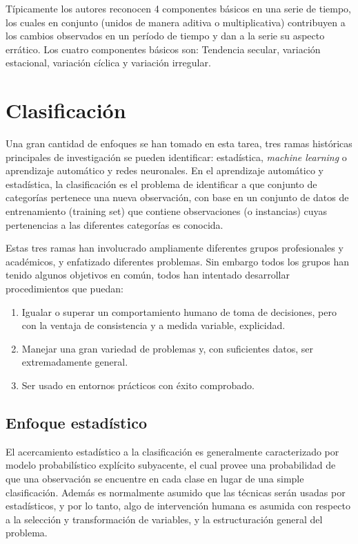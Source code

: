 Típicamente los autores reconocen 4 componentes básicos en una serie de tiempo, los cuales en conjunto (unidos de manera aditiva o multiplicativa) contribuyen a los cambios observados en un período de tiempo y dan a la serie su aspecto errático.
Los cuatro componentes básicos son: Tendencia secular, variación estacional, variación cíclica y variación irregular.

\section{Clasificación}

Una gran cantidad de enfoques se han tomado en esta tarea, tres ramas históricas principales de investigación se pueden identificar: estadística, \textit{machine learning} o aprendizaje automático y redes neuronales. 
En el aprendizaje automático y estadística, la clasificación es el problema de identificar a que conjunto de categorías pertenece una nueva observación, con base en un conjunto de datos de entrenamiento (training set) que contiene observaciones  (o instancias) cuyas pertenencias a las diferentes categorías es conocida.

Estas tres ramas han involucrado ampliamente diferentes grupos profesionales y académicos, y enfatizado diferentes problemas.
Sin embargo todos los grupos han tenido algunos objetivos en común, todos han intentado desarrollar procedimientos que puedan:

\begin{enumerate}
	\item Igualar o superar un comportamiento humano de toma de decisiones, pero con la ventaja de consistencia y a medida variable, explicidad.
	\item Manejar una gran variedad de problemas y, con suficientes datos, ser extremadamente general.
	\item Ser usado en entornos prácticos con éxito comprobado.
\end{enumerate}

\subsection{Enfoque estadístico}
El acercamiento estadístico a la clasificación es generalmente caracterizado por modelo probabilístico explícito subyacente, el cual provee una probabilidad de que una observación se encuentre en cada clase en lugar de una simple clasificación. Además es normalmente asumido que las técnicas serán usadas por estadísticos, y por lo tanto, algo de intervención humana es asumida con respecto a la selección y transformación de variables, y la estructuración general del problema.

